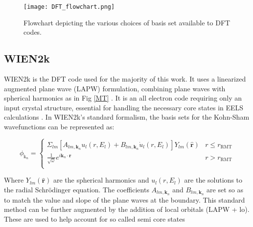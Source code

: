 \begin{figure}
	\centering
	\texttt{[image: DFT\_flowchart.png]}
	\caption{Flowchart depicting the various choices of basis set available to DFT codes.}
	\label{dft-flowchart}
\end{figure}


\subsection{WIEN2k}
WIEN2k is the DFT code used for the majority of this work.  It uses a linearized augmented plane wave (LAPW) formulation, combining plane waves with spherical harmonics as in Fig \ref{MT} \cite{wien2k}.  It is an all electron code requiring only an input crystal structure, essential for handling the necessary  core states  in EELS calculations \cite{wien2k}.  In WIEN2k's standard formalism, the basis sets for the Kohn-Sham wavefunctions can be represented as: 

\begin{equation}
	\phi_{\mathrm{k}_n} = 
	\begin{cases}
	\Sigma_{lm} [A_{lm,\textbf{k}_n}u_l(r,E_l) + B_{lm,\textbf{k}_n}\dot{u}_l(r,E_l)]Y_{lm}(\hat{\textbf{r}}) & r \leq r_{\mathrm{RMT}} \\
	\frac{1}{\sqrt{\omega}}e^{i\textbf{k}_n \cdot \textbf{r}} & r> r_{\mathrm{RMT}} \\
	\end{cases}
\end{equation}

Where $Y_{lm}(\hat{\textbf{r}})$ are the spherical harmonics and $u_l(r,E_l)$ are the solutions to the radial Schr\"odinger equation.  The coefficients $A_{lm,\textbf{k}_n}$ and $B_{lm,\textbf{k}_n}$ are set so as to match the value and slope of the plane waves at the boundary.  This standard method can be further augmented by the addition of local orbitals (LAPW + lo).  These are used to help account for so called semi core states


